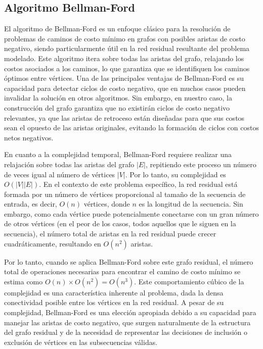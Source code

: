 \documentclass{article}
\begin{document}
\subsection{Algoritmo Bellman-Ford}

El algoritmo de Bellman-Ford es un enfoque clásico para la resolución de problemas de caminos de costo mínimo en grafos con posibles aristas de costo negativo, siendo particularmente útil en la red residual resultante del problema modelado. Este algoritmo itera sobre todas las aristas del grafo, relajando los costos asociados a los caminos, lo que garantiza que se identifiquen los caminos óptimos entre vértices. Una de las principales ventajas de Bellman-Ford es su capacidad para detectar ciclos de costo negativo, que en muchos casos pueden invalidar la solución en otros algoritmos. Sin embargo, en nuestro caso, la construcción del grafo garantiza que no existirán ciclos de costo negativo relevantes, ya que las aristas de retroceso están diseñadas para que sus costos sean el opuesto de las aristas originales, evitando la formación de ciclos con costos netos negativos.

En cuanto a la complejidad temporal, Bellman-Ford requiere realizar una relajación sobre todas las aristas del grafo $|E|$, repitiendo este proceso un número de veces igual al número de vértices $|V|$. Por lo tanto, su complejidad es $O(|V||E|)$. En el contexto de este problema específico, la red residual está formada por un número de vértices proporcional al tamaño de la secuencia de entrada, es decir, $O(n)$ vértices, donde $n$ es la longitud de la secuencia. Sin embargo, como cada vértice puede potencialmente conectarse con un gran número de otros vértices (en el peor de los casos, todos aquellos que le siguen en la secuencia), el número total de aristas en la red residual puede crecer cuadráticamente, resultando en $O(n^2)$ aristas.

Por lo tanto, cuando se aplica Bellman-Ford sobre este grafo residual, el número total de operaciones necesarias para encontrar el camino de costo mínimo se estima como $O(n) \times O(n^2) = O(n^3)$. Este comportamiento cúbico de la complejidad es una característica inherente al problema, dada la densa conectividad posible entre los vértices en la red residual. A pesar de su complejidad, Bellman-Ford es una elección apropiada debido a su capacidad para manejar las aristas de costo negativo, que surgen naturalmente de la estructura del grafo residual y de la necesidad de representar las decisiones de inclusión o exclusión de vértices en las subsecuencias válidas.
\end{document}
